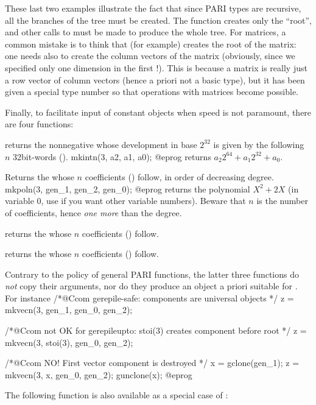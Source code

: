 These last two examples illustrate the fact that since PARI types are
recursive, all the branches of the tree must be created. The function
 creates only the ``root'', and other calls to  must be
made to produce the whole tree. For matrices, a common mistake is to think
that  (for example) creates the root of the
matrix: one needs also to create the column vectors of the matrix (obviously,
since we specified only one dimension in the first !). This is
because a matrix is really just a row vector of column vectors (hence a
priori not a basic type), but it has been given a special type number so that
operations with matrices become possible.

Finally, to facilitate input of constant objects when speed is not paramount,
there are four  functions:

returns the nonnegative  whose development in base $2^{32}$
is given by the following $n$ 32bit-words ().
\bprog
  mkintn(3, a2, a1, a0);
@eprog
\noindent returns $a_2 2^{64} + a_1 2^{32} + a_0$.

Returns the  whose $n$ coefficients () follow, in order of
decreasing degree.
\bprog
  mkpoln(3, gen_1, gen_2, gen_0);
@eprog
\noindent returns the polynomial $X^2 + 2X$ (in variable $0$, use
 if you want other variable numbers). Beware that $n$ is the
number of coefficients, hence \emph{one more} than the degree.

returns the  whose $n$ coefficients () follow.

returns the  whose $n$ coefficients () follow.

 Contrary to the policy of general PARI functions, the
latter three functions do \emph{not} copy their arguments, nor do they produce
an object a priori suitable for . For instance
\bprog
  /*@Ccom gerepile-safe: components are universal objects */
  z = mkvecn(3, gen_1, gen_0, gen_2);

  /*@Ccom not OK for gerepileupto: stoi(3) creates component before root */
  z = mkvecn(3, stoi(3), gen_0, gen_2);

  /*@Ccom NO! First vector component  is destroyed */
  x = gclone(gen_1);
  z = mkvecn(3, x, gen_0, gen_2);
  gunclone(x);
@eprog

\noindent The following function is also available as a special case of
:

